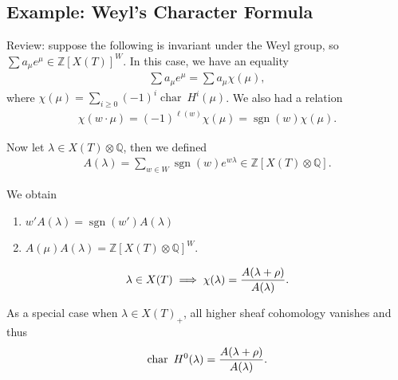 \hypertarget{example-weyls-character-formula}{%
\subsection{Example: Weyl's Character
Formula}\label{example-weyls-character-formula}}

Review: suppose the following is invariant under the Weyl group, so
\(\sum a_\mu e^\mu \in {\mathbb{Z}}[X(T)]^W\). In this case, we have an
equality
\begin{align*}   \sum a_\mu e^\mu = \sum a_\mu \chi(\mu) ,\end{align*}
where
\(\chi(\mu) = \sum_{i\geq 0} (-1)^i \operatorname{char}~H^i(\mu)\). We
also had a relation
\begin{align*}   \chi(w\cdot \mu) = (-1)^{\ell(w)} \chi(\mu) = \operatorname{sgn}(w) \chi(\mu) .\end{align*}

Now let \(\lambda \in X(T) \otimes{\mathbb{Q}}\), then we defined
\begin{align*}   A(\lambda) = \sum_{w\in W} \operatorname{sgn}(w) e^{w\lambda} \in {\mathbb{Z}}[X(T) \otimes{\mathbb{Q}}] .\end{align*}

We obtain

\begin{enumerate}
\def\labelenumi{\arabic{enumi}.}
\item
  \(w' A(\lambda) = \operatorname{sgn}(w') A(\lambda)\)
\item
  \(A(\mu) A(\lambda) = {\mathbb{Z}}[X(T) \otimes{\mathbb{Q}}]^W\).
\end{enumerate}

\begin{theorem}

\begin{theorem}

\begin{align*}   \lambda\in X(T) \implies \chi(\lambda) = {A(\lambda + \rho) \over A(\lambda)} .\end{align*}

As a special case when \(\lambda \in X(T)_+\), all higher sheaf
cohomology vanishes and thus
\begin{align*}   \operatorname{char}~H^0(\lambda) = {A(\lambda + \rho) \over A(\lambda)} .\end{align*}

\end{theorem}

\end{theorem}

